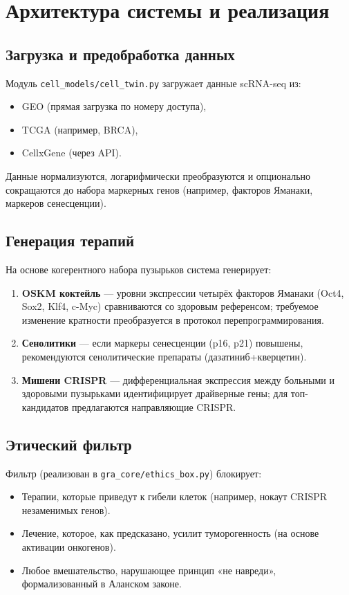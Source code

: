 \documentclass[12pt,a4paper]{article}
\begin{document}
\section{Архитектура системы и реализация}

\subsection{Загрузка и предобработка данных}
Модуль \texttt{cell\_models/cell\_twin.py} загружает данные scRNA-seq из:
\begin{itemize}
    \item GEO (прямая загрузка по номеру доступа),
    \item TCGA (например, BRCA),
    \item CellxGene (через API).
\end{itemize}
Данные нормализуются, логарифмически преобразуются и опционально сокращаются до набора маркерных генов (например, факторов Яманаки, маркеров сенесценции).

\subsection{Генерация терапий}
На основе когерентного набора пузырьков система генерирует:
\begin{enumerate}
    \item \textbf{OSKM коктейль} — уровни экспрессии четырёх факторов Яманаки (Oct4, Sox2, Klf4, c-Myc) сравниваются со здоровым референсом; требуемое изменение кратности преобразуется в протокол перепрограммирования.
    \item \textbf{Сенолитики} — если маркеры сенесценции (p16, p21) повышены, рекомендуются сенолитические препараты (дазатиниб+кверцетин).
    \item \textbf{Мишени CRISPR} — дифференциальная экспрессия между больными и здоровыми пузырьками идентифицирует драйверные гены; для топ-кандидатов предлагаются направляющие CRISPR.
\end{enumerate}

\subsection{Этический фильтр}
Фильтр (реализован в \texttt{gra\_core/ethics\_box.py}) блокирует:
\begin{itemize}
    \item Терапии, которые приведут к гибели клеток (например, нокаут CRISPR незаменимых генов).
    \item Лечение, которое, как предсказано, усилит туморогенность (на основе активации онкогенов).
    \item Любое вмешательство, нарушающее принцип «не навреди», формализованный в Аланском законе.
\end{itemize}
\end{document}
